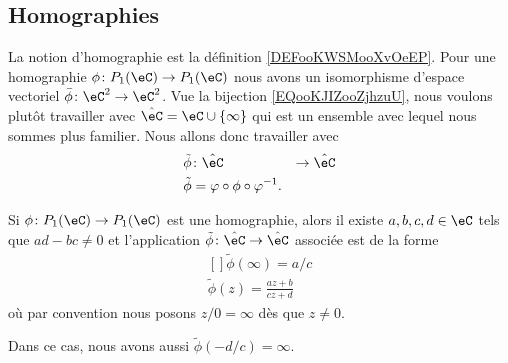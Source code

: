 \subsection{Homographies}

La notion d'homographie est la définition \ref{DEFooKWSMooXvOeEP}. Pour une homographie \( \phi\colon P_1(\eC)\to P_1(\eC)\) nous avons un isomorphisme d'espace vectoriel \( \bar\phi\colon \eC^2\to \eC^2\). Vue la bijection \eqref{EQooKJIZooZjhzuU}, nous voulons plutôt travailler avec \( \hat \eC=\eC\cup\{ \infty \}\) qui est un ensemble avec lequel nous sommes plus familier. Nous allons donc travailler avec
\begin{equation}
    \begin{aligned}
        \tilde \phi&\colon \hat \eC&\to \hat \eC \\
        \tilde \phi&=\varphi\circ\phi\circ\varphi^{-1}.
    \end{aligned}
\end{equation}

\begin{proposition}
    Si \( \phi\colon P_1(\eC)\to P_1(\eC)\) est une homographie, alors il existe \( a,b,c,d\in \eC\) tels que \( ad-bc\neq 0\) et l'application \( \tilde \phi\colon \hat \eC\to \hat \eC\) associée est de la forme
    \begin{equation}
        \begin{aligned}[]
            \tilde \phi(\infty)=a/c\\
            \tilde \phi(z)=\frac{ az+b }{ cz+d }
        \end{aligned}
    \end{equation}
    où par convention nous posons \( z/0=\infty\) dès que \( z\neq 0\).

    Dans ce cas, nous avons aussi \( \tilde \phi(-d/c)=\infty\).
\end{proposition}

